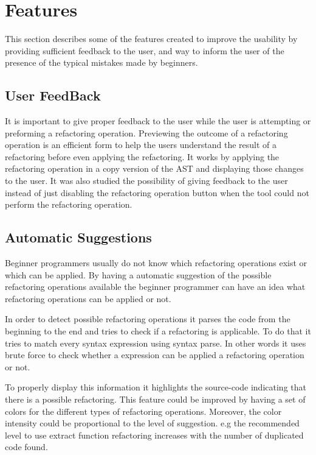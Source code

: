 \section{Features}
This section describes some of the features created to improve the usability by providing
sufficient feedback to the user, and way to inform the user of the presence
of the typical mistakes made by beginners.
\subsection{User FeedBack}
It is important to give proper feedback to the user while the user is attempting or
preforming a refactoring operation.
Previewing the outcome of a refactoring operation is an efficient form to
help the users understand the result of a refactoring before even applying the refactoring. %
It works by applying the refactoring operation in a copy version of the AST
and displaying those changes to the user.
It was also studied the possibility of giving feedback to the user instead of
just disabling the refactoring operation button when the tool could not perform the refactoring operation.

\subsection{Automatic Suggestions}
Beginner programmers usually do not know which refactoring operations exist or
which can be applied.
By having a automatic suggestion of the possible refactoring operations available
 the beginner programmer can have an idea what refactoring operations can be
 applied or not.

In order to detect possible refactoring operations it parses the code from the
beginning to the end and tries to check if a refactoring is applicable.
To do that it tries to match every syntax expression using syntax parse.
In other words it uses brute force to check whether a expression can be applied
a refactoring operation or not.

To properly display this information it highlights the source-code indicating
that there is a possible refactoring.
This feature could be improved by having a set of colors for the different types
of refactoring operations.
Moreover, the color intensity could be proportional to the level
of suggestion. e.g the recommended level to use extract function refactoring
increases with the number of duplicated code found.


